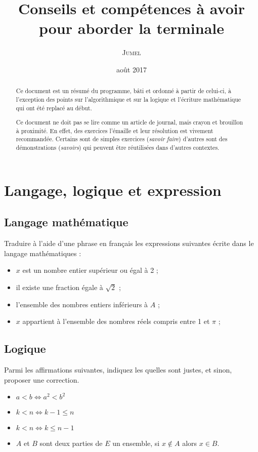\documentclass[a4paper,12pt,french]{article}
\title{Conseils et compétences à avoir pour aborder la terminale}
\author{\textsc{Jumel}}
\date{août 2017}
\begin{document}
\maketitle

\begin{abstract}
  Ce document est un résumé du programme, bâti et ordonné à partir de
  celui-ci, à l'exception des points sur l'algorithmique et sur la
  logique et l'écriture mathématique qui ont été replacé au début.

  Ce document ne doit pas se lire comme un article de journal, mais
  crayon et brouillon à proximité. En effet, des exercices l'émaille et
  leur résolution est vivement recommandée. Certains sont de simples
  exercices (\emph{savoir faire}) d'autres sont des démonstrations
  (\emph{savoirs}) qui peuvent être réutilisées dans d'autres contextes.
\end{abstract}

\tableofcontents

\pagebreak

\section{Langage, logique et expression}

\subsection{Langage mathématique}

Traduire à l'aide d'une phrase en français les expressions suivantes
écrite dans le langage mathématiques :
\begin{itemize}
  \item $x$ est un nombre entier supérieur ou égal à 2 ;
  \item il existe une fraction égale à $\sqrt{2}$ ;
  \item l'ensemble des nombres entiers inférieurs à $A$ ;
  \item $x$ appartient à l'ensemble des nombres réels compris entre 1 et
    $\pi$ ;
\end{itemize}

\subsection{Logique}

Parmi les affirmations suivantes, indiquez les quelles sont justes, et
sinon, proposer une correction.
\begin{itemize}
  \item $a<b \iff a^2 < b^2$
  \item $k < n \iff k - 1 \leqslant n$
  \item $k < n \iff k \leqslant n - 1$
  \item $A$ et $B$ sont deux parties de $E$ un ensemble, si $x \not\in
    A$ alors $x\in B$.
\end{itemize}
\end{document}
